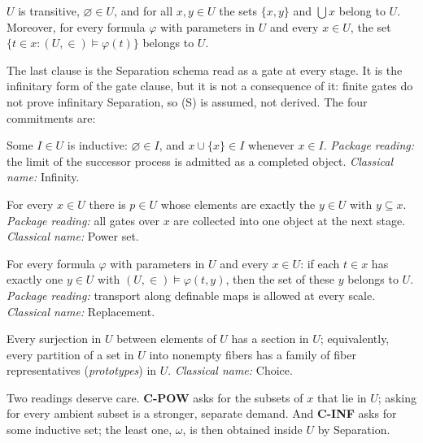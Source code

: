 \documentclass[11pt]{article}
\theoremstyle{definition}
\begin{document}
\begin{description}[leftmargin=1.2em]
\item[\textbf{(S)} Structural premise.] $U$ is transitive, $\varnothing\in U$, and for all
$x,y\in U$ the sets $\{x,y\}$ and $\bigcup x$ belong to $U$. Moreover, for every formula $\varphi$
with parameters in $U$ and every $x\in U$, the set $\{t\in x: (U,\in)\models\varphi(t)\}$ belongs
to $U$.
\end{description}

The last clause is the Separation schema read as a gate at every stage. It is the infinitary form
of the gate clause, but it is not a consequence of it: finite gates do not prove infinitary
Separation, so (S) is assumed, not derived. The four commitments are:

\begin{description}[leftmargin=1.2em]
\item[\textbf{C-INF} (inductive-stage completion).] Some $I\in U$ is inductive: $\varnothing\in
  I$, and $x\cup\{x\}\in I$ whenever $x\in I$. \emph{Package reading:} the limit of the successor
  process is admitted as a completed object. \emph{Classical name:} Infinity.
\item[\textbf{C-POW} (full subpackage completion).] For every $x\in U$ there is $p\in U$ whose
  elements are exactly the $y\in U$ with $y\subseteq x$. \emph{Package reading:} all gates over
  $x$ are collected into one object at the next stage. \emph{Classical name:} Power set.
\item[\textbf{C-REPL} (unbounded transport).] For every formula $\varphi$ with parameters in $U$
  and every $x\in U$: if each $t\in x$ has exactly one $y\in U$ with $(U,\in)\models\varphi(t,y)$,
  then the set of these $y$ belongs to $U$. \emph{Package reading:} transport along definable maps
  is allowed at every scale. \emph{Classical name:} Replacement.
\item[\textbf{C-SEL} (prototype selection).] Every surjection in $U$ between elements of $U$ has
  a section in $U$; equivalently, every partition of a set in $U$ into nonempty fibers has a
  family of fiber representatives (\emph{prototypes}) in $U$. \emph{Classical name:} Choice.
\end{description}

Two readings deserve care. \textbf{C-POW} asks for the subsets of $x$ that lie in $U$; asking for
every ambient subset is a stronger, separate demand. And \textbf{C-INF} asks for some inductive
set; the least one, $\omega$, is then obtained inside $U$ by Separation.
\end{document}

